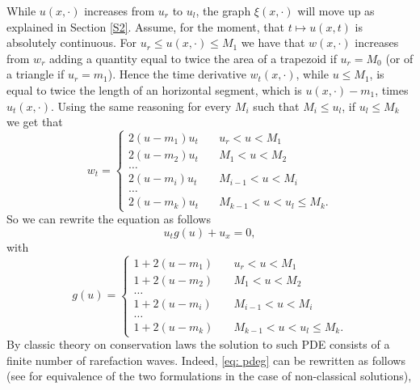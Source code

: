 \documentclass[12pt]{article}
\newcommand{\1}{\mathds{1}}
\theoremstyle{definition}
\begin{document}
\par While $u(x,\cdot)$ increases from $u_r$ to $u_l$, the graph $\xi(x,\cdot)$ will move up as explained in Section \ref{S2}. Assume, for the moment, that $t\mapsto u(x,t)$ is absolutely continuous. For $u_r \leq u(x,\cdot) \leq M_1$ we have that $w(x,\cdot)$ increases from $w_r$ adding a quantity equal to twice the area of a trapezoid if $u_r=M_0$ (or of a triangle if $u_r=m_1$). Hence the time derivative $w_t(x,\cdot)$, while $u\leq M_1$, is equal to twice the length of an horizontal segment, which is $u(x,\cdot)-m_1$, times $u_t(x,\cdot)$. 
Using the same reasoning for every $M_i$ such that $M_i\leq u_l$, if $u_l\leq M_k$ we get that \begin{equation}
    w_t = \begin{cases} 
        2(u-m_1) u_t &\quad u_r < u < M_{1}\\
        2(u-m_2) u_t &\quad M_1 < u < M_2 \\
        \dots \\
        2(u-m_i)u_t &\quad M_{i-1} < u< M_i \\
        \dots \\
        2(u-m_k)u_t &\quad M_{k-1} < u < u_l \leq M_k.
    \end{cases}
\end{equation}
So we can rewrite the equation as follows \begin{equation}\label{eq: pdeg}
    u_t g(u) + u_x = 0,
\end{equation} with 
\begin{equation}
    g(u) = \begin{cases}
        1+2(u-m_1)&\quad u_r < u < M_{1}\\
        1+2(u-m_2)  &\quad M_1 < u < M_2 \\
        \dots \\
        1+2(u-m_i) &\quad M_{i-1} < u< M_i \\
        \dots \\
        1+2(u-m_k) &\quad M_{k-1} < u < u_l \leq M_k.
    \end{cases}
\end{equation}
By classic theory on conservation laws the solution to such PDE consists of a finite number of rarefaction waves. Indeed, \eqref{eq: pdeg} can be rewritten as follows (see \cite[Section~3.1]{DAFLIBRO} for equivalence of the two formulations in the case of non-classical solutions),
\end{document}
